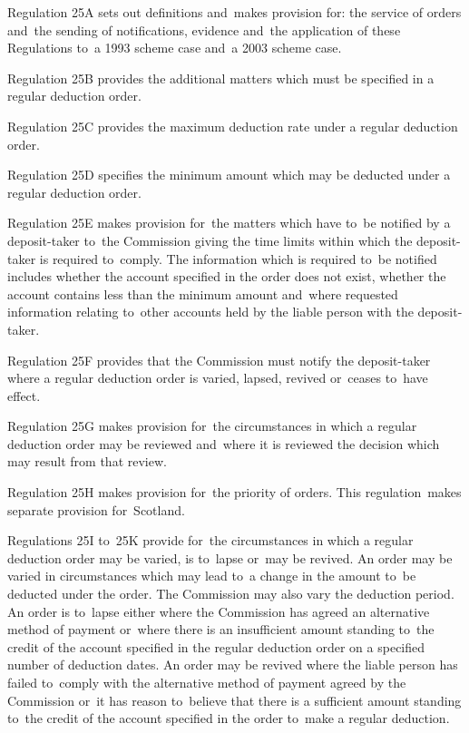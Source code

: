 \documentclass[12pt,a4paper]{article}
\begin{document}
Regulation 25A sets out definitions and~makes provision for: the service of orders and~the sending of notifications, evidence and~the application of these Regulations to~a 1993 scheme case and~a 2003 scheme case.

Regulation 25B provides the additional matters which must be specified in a regular deduction order.

Regulation 25C provides the maximum deduction rate under a regular deduction order.

Regulation 25D specifies the minimum amount which may be deducted under a regular deduction order.

Regulation 25E makes provision for~the matters which have to~be notified by a deposit-taker to~the Commission giving the time limits within which the deposit-taker is required to~comply. The information which is required to~be notified includes whether the account specified in the order does not exist, whether the account contains less than the minimum amount and~where requested information relating to~other accounts held by the liable person with the deposit-taker.

Regulation 25F provides that the Commission must notify the deposit-taker where a regular deduction order is varied, lapsed, revived or~ceases to~have effect.

Regulation 25G makes provision for~the circumstances in which a regular deduction order may be reviewed and~where it is reviewed the decision which may result from that review.

Regulation 25H makes provision for~the priority of orders. This regulation~makes separate provision for~Scotland.

Regulations 25I to~25K provide for~the circumstances in which a regular deduction order may be varied, is to~lapse or~may be revived. An order may be varied in circumstances which may lead to~a change in the amount to~be deducted under the order. The Commission may also vary the deduction period. An order is to~lapse either where the Commission has agreed an alternative method of payment or~where there is an insufficient amount standing to~the credit of the account specified in the regular deduction order on a specified number of deduction dates. An order may be revived where the liable person has failed to~comply with the alternative method of payment agreed by the Commission or~it has reason to~believe that there is a sufficient amount standing to~the credit of the account specified in the order to~make a regular deduction.
\end{document}
